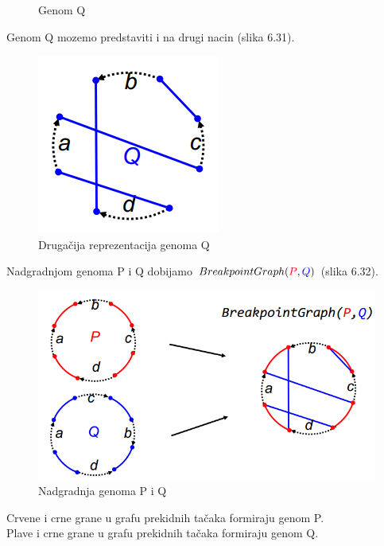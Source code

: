 \begin{figure}[h!]
  \caption{Genom Q}
\endminipage\hfill
\end{figure}

Genom {\color{blue}Q} mozemo predstaviti i na drugi nacin (slika 6.31).
\begin{figure}[h!]
\centering
\includegraphics[scale=0.75]{poglavlja/6/slike/Q2.PNG}
\caption{Drugačija reprezentacija genoma Q}
\label{slika:X}
\end{figure}

\newpage
\noindent Nadgradnjom genoma {\color{red}P} i {\color{blue}Q} dobijamo $BreakpointGraph({\color{red}P}, {\color{blue}Q})$ (slika 6.32).
\begin{figure}[h]
\includegraphics[scale=0.7]{poglavlja/6/slike/breakpointgraph.PNG}
\caption{Nadgradnja genoma P i Q}
\label{slika:X}
\end{figure}

{\color{red} Crvene} i crne grane u grafu prekidnih tačaka formiraju genom P.\\

{\color{blue} Plave} i crne grane u grafu prekidnih tačaka  formiraju genom Q.\\

